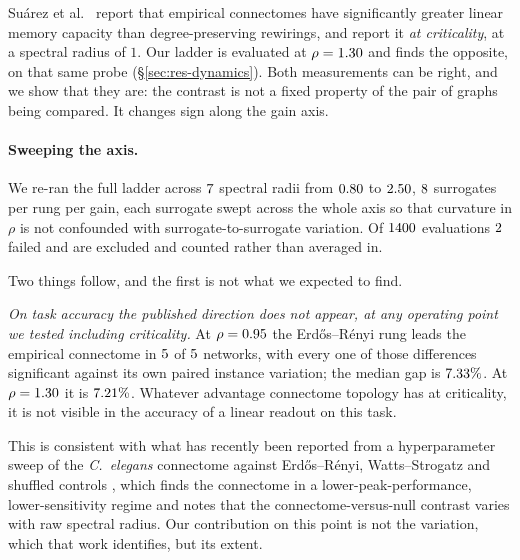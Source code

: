 Su\'arez et al.~\cite{suarez2024connectome} report that empirical connectomes have significantly greater
linear memory capacity than degree-preserving rewirings, and report it \emph{at
criticality}, at a spectral radius of $1$. Our ladder is evaluated at
$\rho = 1.30$ and finds the opposite, on that same probe
(\S\ref{sec:res-dynamics}). Both measurements can be right, and we show that they are: the
contrast is not a fixed property of the pair of graphs being compared. It changes sign
along the gain axis.

\paragraph{Sweeping the axis.}
We re-ran the full ladder across $7$ spectral radii from $0.80$ to
$2.50$, $8$ surrogates per rung per gain, each surrogate swept across
the whole axis so that curvature in $\rho$ is not confounded with surrogate-to-surrogate
variation. Of $1400$ evaluations $2$ failed and are excluded and
counted rather than averaged in.

Two things follow, and the first is not what we expected to find.

\emph{On task accuracy the published direction does not appear, at any operating point we
tested including criticality.} At $\rho = 0.95$ the Erd\H{o}s--R\'enyi rung leads
the empirical connectome in $5$ of $5$ networks, with
every one of those differences significant against its own paired instance variation;
the median gap is $7.33\%$. At $\rho = 1.30$ it is $7.21\%$. Whatever
advantage connectome topology has at criticality, it is not visible in the accuracy of a
linear readout on this task.

This is consistent with what has recently been reported from a hyperparameter sweep of
the \textit{C.\ elegans} connectome against Erd\H{o}s--R\'enyi, Watts--Strogatz and
shuffled controls \cite{hyperparam2026determinants}, which finds the connectome in a
lower-peak-performance, lower-sensitivity regime and notes that the
connectome-versus-null contrast varies with raw spectral radius. Our contribution on this
point is not the variation, which that work identifies, but its extent.

